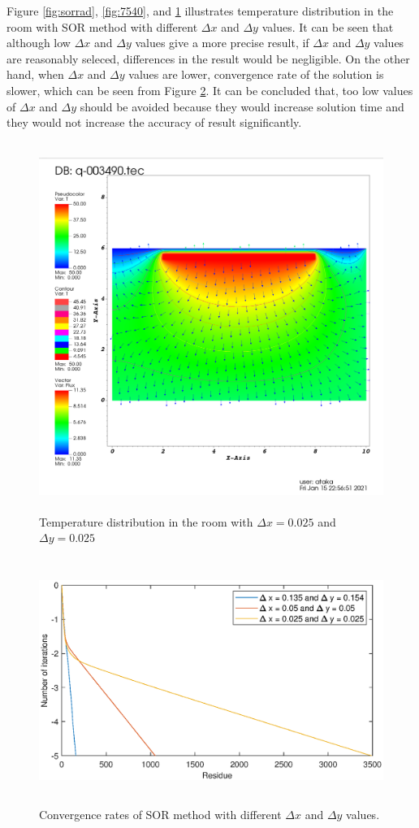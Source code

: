 \documentclass[letterpaper,12pt]{article}
\begin{document}
Figure \ref{fig:sorrad}, \ref{fig:7540}, and \ref{fig:402242} illustrates temperature
distribution in the room with SOR method with different $\Delta x$ and $\Delta y$ values. 
It can be seen that although low $\Delta x$ and $\Delta y$ values give a more precise result, 
if $\Delta x$ and $\Delta y$ values are reasonably seleced, differences in the result would 
be negligible. On the other hand, when $\Delta x$ and $\Delta y$ values are lower, convergence rate 
of the solution is slower, which can be seen from Figure \ref{fig:converratedelta}. It can be concluded that, 
too low values of $\Delta x$ and $\Delta y$ should be avoided because they would increase solution time and they 
would not increase the accuracy of result significantly.

\begin{figure}[H] 
	\centering 
	\includegraphics[max height=12cm]{graphs/imax402jmax242_default/imax402jmax242_default.png}
	\caption{Temperature distribution in the room with $\Delta x=0.025$ and $\Delta y = 0.025$}
 	\label{fig:402242}
\end{figure}
\begin{figure}[H] 
	\centering 
	\includegraphics[max height=8cm]{graphs/residual_deltax.eps}
	\caption{Convergence rates of SOR method with different $\Delta x$ and $\Delta y$ values.}
 	\label{fig:converratedelta}
\end{figure}
\end{document}
